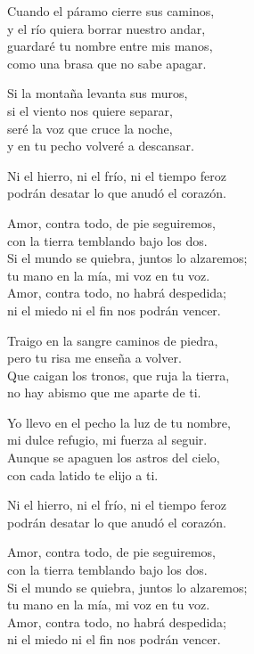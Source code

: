 \begin{lyrics}

Cuando el páramo cierre sus caminos,\\
y el río quiera borrar nuestro andar,\\
guardaré tu nombre entre mis manos,\\
como una brasa que no sabe apagar.

Si la montaña levanta sus muros,\\
si el viento nos quiere separar,\\
seré la voz que cruce la noche,\\
y en tu pecho volveré a descansar.

Ni el hierro, ni el frío, ni el tiempo feroz\\
podrán desatar lo que anudó el corazón.

Amor, contra todo, de pie seguiremos,\\
con la tierra temblando bajo los dos.\\
Si el mundo se quiebra, juntos lo alzaremos;\\
tu mano en la mía, mi voz en tu voz.\\
Amor, contra todo, no habrá despedida;\\
ni el miedo ni el fin nos podrán vencer.

Traigo en la sangre caminos de piedra,\\
pero tu risa me enseña a volver.\\
Que caigan los tronos, que ruja la tierra,\\
no hay abismo que me aparte de ti.

Yo llevo en el pecho la luz de tu nombre,\\
mi dulce refugio, mi fuerza al seguir.\\
Aunque se apaguen los astros del cielo,\\
con cada latido te elijo a ti.

Ni el hierro, ni el frío, ni el tiempo feroz\\
podrán desatar lo que anudó el corazón.

Amor, contra todo, de pie seguiremos,\\
con la tierra temblando bajo los dos.\\
Si el mundo se quiebra, juntos lo alzaremos;\\
tu mano en la mía, mi voz en tu voz.\\
Amor, contra todo, no habrá despedida;\\
ni el miedo ni el fin nos podrán vencer.


\end{lyrics}
